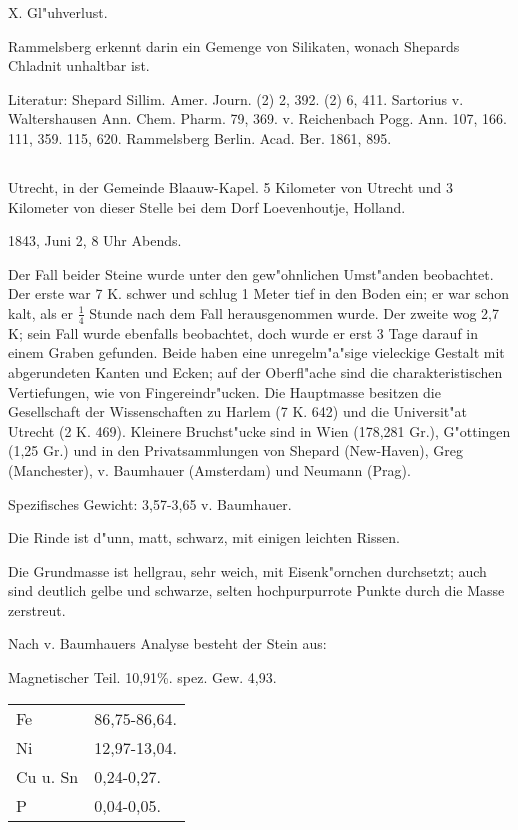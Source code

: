 \documentclass[a4paper, 11pt, oneside]{article}
\begin{document}
X. Gl"uhverlust.

Rammelsberg erkennt darin ein Gemenge von Silikaten, wonach Shepards Chladnit unhaltbar ist.

\normalsize
Literatur: Shepard Sillim. Amer. Journ. (2) 2, 392. (2) 6, 411. Sartorius v. Waltershausen Ann. Chem. Pharm. 79, 369. v. Reichenbach Pogg. Ann. 107, 166. 111, 359. 115, 620. Rammelsberg Berlin. Acad. Ber. 1861, 895.

\subsection{}
\LARGE
\paragraph{}
Utrecht, in der Gemeinde Blaauw-Kapel. 5 Kilometer von Utrecht und 3 Kilometer von dieser Stelle bei dem Dorf Loevenhoutje, Holland.

1843, Juni 2, 8 Uhr Abends.

Der Fall beider Steine wurde unter den gew"ohnlichen Umst"anden beobachtet. Der erste war 7 K. schwer und schlug 1 Meter tief in den Boden ein; er war schon kalt, als er $\mathfrak{\frac{1}{4}}$ Stunde nach dem Fall herausgenommen wurde. Der zweite wog 2,7 K; sein Fall wurde ebenfalls beobachtet, doch wurde er erst 3 Tage darauf in einem Graben gefunden. Beide haben eine unregelm"a"sige vieleckige Gestalt mit abgerundeten Kanten und Ecken; auf der Oberfl"ache sind die charakteristischen Vertiefungen, wie von Fingereindr"ucken. Die Hauptmasse besitzen die Gesellschaft der Wissenschaften zu Harlem (7 K. 642) und die Universit"at Utrecht (2 K. 469). Kleinere Bruchst"ucke sind in Wien (178,281 Gr.), G"ottingen (1,25 Gr.) und in den Privatsammlungen von Shepard (New-Haven), Greg (Manchester), v. Baumhauer (Amsterdam) und Neumann (Prag).

Spezifisches Gewicht: 3,57-3,65 v. Baumhauer.

Die Rinde ist d"unn, matt, schwarz, mit einigen leichten Rissen.

Die Grundmasse ist hellgrau, sehr weich, mit Eisenk"ornchen durchsetzt; auch sind deutlich gelbe und schwarze, selten hochpurpurrote Punkte durch die Masse zerstreut.

Nach v. Baumhauers Analyse besteht der Stein aus:
\begin{center}
Magnetischer Teil. 10,91\%. spez. Gew. 4,93.
\end{center}
\begin{table}[H]
    \centering\swabfamily\Large
    \begin{tabular}{l l}
        Fe & 86,75-86,64. \\
        Ni & 12,97-13,04. \\
        Cu u. Sn  & 0,24-0,27. \\
        P & 0,04-0,05. \\
    \end{tabular}
\end{table}
\end{document}
